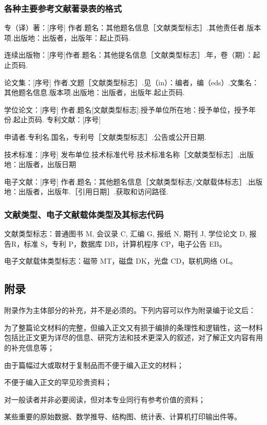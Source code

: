 \documentclass[a4paper,12pt,oneside,openany]{book}
\begin{document}
\begin{CJK}{UTF8}{hei}
\subsubsection{各种主要参考文献著录表的格式}

专（译）著：{[}序号{]} 作者.题名：其他题名信息［文献类型标志］.其他责任者.版本项.出版地：出版者，出版年：起止页码.

连续出版物：{[}序号{]}作者.题名：其他提名信息［文献类型标志］.年，卷（期）：起止页码.

论文集：{[}序号{]} 作者.文题［文献类型标志］.见（in）：编者，编（eds）.文集名：其他题名信息.版本项.出版地：出版者，出版年.起止页码.

学位论文：{[}序号{]} 作者.题名{[}文献类型标志{]}.授予单位所在地：授予单位，授予年份.起止页码. 专利文献：{[}序号{]}

申请者.专利名.国名，专利号［文献类型标志］.公告或公开日期.

技术标准：{[}序号{]} 发布单位.技术标准代号.技术标准名称［文献类型标志］.出版地：出版者，出版日期

电子文献：{[}序号{]} 作者.题名：其他题名信息［文献类型标志/文献载体标志］.出版地：出版者，出版年.［引用日期］.获取和访问路径. 


\subsubsection{文献类型、电子文献载体类型及其标志代码}

文献类型标志：普通图书 M, 会议录 C, 汇编 G, 报纸 N, 期刊 J, 学位论文 D, 报告R，标准 S，专利 P，数据库
DB，计算机程序 CP，电子公告 EB。

电子文献载体类型标志：磁带 MT，磁盘 DK，光盘 CD，联机网络 OL。 


\subsection{附录}

附录作为主体部分的补充，并不是必须的。下列内容可以作为附录编于论文后：

为了整篇论文材料的完整，但编入正文又有损于编排的条理性和逻辑性，这一材料包括比正文更为详尽的信息、研究方法和技术更深入的叙述，对了解正文内容有用的补充信息等； 

由于篇幅过大或取材于复制品而不便于编入正文的材料；

不便于编入正文的罕见珍贵资料；

对一般读者并非必要阅读，但对本专业同行有参考价值的资料；

某些重要的原始数据、数学推导、结构图、统计表、计算机打印输出件等。


\end{CJK}
\end{document}
